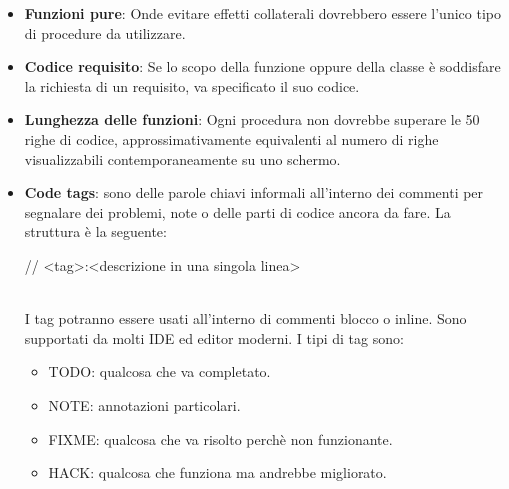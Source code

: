 \begin{itemize}
            \item \textbf{Funzioni pure}: Onde evitare effetti collaterali dovrebbero essere l'unico tipo di procedure da utilizzare.
            \item \textbf{Codice requisito}: Se lo scopo della funzione oppure della classe è soddisfare la richiesta di un requisito, va specificato il suo codice.
            \item \textbf{Lunghezza delle funzioni}: Ogni procedura non dovrebbe superare le 50 righe di codice, approssimativamente equivalenti al numero di righe visualizzabili contemporaneamente su uno schermo.
        \item \textbf{Code tags}: sono delle parole chiavi informali all'interno dei commenti per segnalare dei problemi, note o delle parti di codice ancora da fare. La struttura è la seguente:
            \begin{center}
                // <tag>:<descrizione in una singola linea> 
            \end{center}\\
        I tag potranno essere usati all'interno di commenti blocco o inline.  Sono supportati da molti IDE ed editor moderni. I tipi di tag sono:
            \begin{itemize}
                \item TODO: qualcosa che va completato.
                \item NOTE: annotazioni particolari.
                \item FIXME: qualcosa che va risolto perchè non funzionante.
                \item HACK: qualcosa che funziona ma andrebbe migliorato.
            \end{itemize}
            
        \end{itemize}
        
